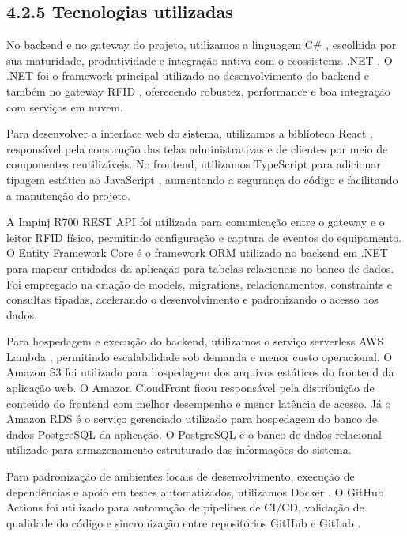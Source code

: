 \hypertarget{__RefHeading___Toc4811_3118176633}{}
\subsection*{4.2.5 Tecnologias utilizadas}
\label{ages-iii:text-h-0085}

No backend e no gateway do projeto, utilizamos a linguagem C\# \cite{ages-iii-csharp}, escolhida por sua maturidade, produtividade e integração nativa com o ecossistema .NET \cite{ages-iii-dotnet}.
O .NET foi o framework principal utilizado no desenvolvimento do backend e também no gateway RFID \cite{ages-iii-rfid-nist}, oferecendo robustez, performance e boa integração com serviços em nuvem.

Para desenvolver a interface web do sistema, utilizamos a biblioteca React \cite{ages-iii-react}, responsável pela construção das telas administrativas e de clientes por meio de componentes reutilizáveis.
No frontend, utilizamos TypeScript \cite{ages-iii-typescript} para adicionar tipagem estática ao JavaScript \cite{ages-iii-javascript}, aumentando a segurança do código e facilitando a manutenção do projeto.

A Impinj R700 REST API \cite{ages-iii-impinj-iot-interface} foi utilizada para comunicação entre o gateway e o leitor RFID \cite{ages-iii-rfid-nist} físico, permitindo configuração e captura de eventos do equipamento.
O Entity Framework Core \cite{ages-iii-entity-framework} é o framework ORM utilizado no backend em .NET \cite{ages-iii-dotnet} para mapear entidades da aplicação para tabelas relacionais no banco de dados. Foi empregado na criação de models, migrations, relacionamentos, constraints e consultas tipadas, acelerando o desenvolvimento e padronizando o acesso aos dados.

Para hospedagem e execução do backend, utilizamos o serviço serverless AWS Lambda \cite{ages-iii-aws-lambda}, permitindo escalabilidade sob demanda e menor custo operacional.
O Amazon S3 \cite{ages-iii-s3} foi utilizado para hospedagem dos arquivos estáticos do frontend da aplicação web.
O Amazon CloudFront \cite{ages-iii-cloudfront} ficou responsável pela distribuição de conteúdo do frontend com melhor desempenho e menor latência de acesso.
Já o Amazon RDS \cite{ages-iii-rds} é o serviço gerenciado utilizado para hospedagem do banco de dados PostgreSQL \cite{ages-iii-postgresql} da aplicação.
O PostgreSQL é o banco de dados relacional utilizado para armazenamento estruturado das informações do sistema.

Para padronização de ambientes locais de desenvolvimento, execução de dependências e apoio em testes automatizados, utilizamos Docker \cite{ages-iii-docker}.
O GitHub Actions \cite{ages-iii-github-actions} foi utilizado para automação de pipelines de CI/CD, validação de qualidade do código e sincronização entre repositórios GitHub e GitLab \cite{ages-iii-gitlab}.\par
